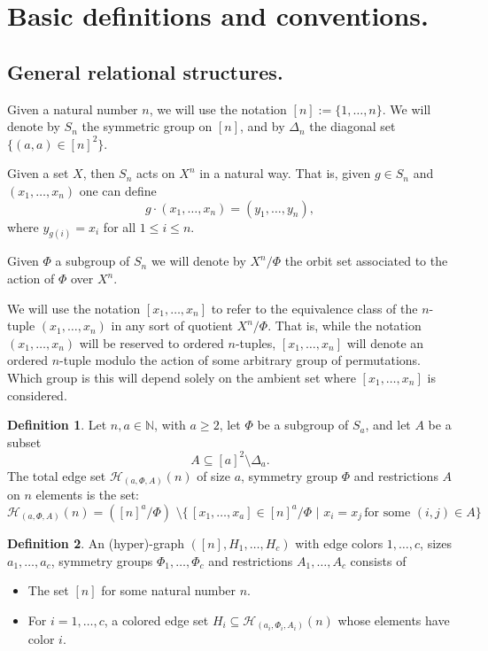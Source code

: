 \documentclass[11pt,notitlepage,a4paper]{article}
\theoremstyle{definition}
\newtheorem{definition}{Definition}[section]
\newcommand{\N}{\mathbb{N}}
\begin{document}
\section{Basic definitions and conventions.}



\subsection{General relational structures.}

Given a natural number $n$, we will use the notation
$[n]:= \{1,\dots, n\}$. We will denote by $S_n$
the symmetric group on $[n]$, and by $\Delta_n$ the 
diagonal set $\{(a,a)\in [n]^2 \}$. \par
Given a set $X$, then $S_n$ acts on $X^n$ in a natural way. That is, 
given $g\in S_n$ and $(x_1, \dots, x_n)$ one can define
\[ g \cdot (x_1,\dots,x_n) =(y_1,\dots,y_n), \]
where $y_{g(i)}=x_i$ for all $1\leq i\leq n$.\par
Given $\Phi$ a subgroup of $S_n$ we will denote by $X^n/\Phi$
the orbit set associated to the action of $\Phi$ over $X^n$.\par
We will use the notation $[x_1,\dots,x_n]$ to refer to the 
equivalence class of the $n$-tuple $(x_1,\dots, x_n)$ in 
any sort of quotient $X^n/\Phi$. That is, while the notation
$(x_1,\dots, x_n)$ will be reserved to ordered $n$-tuples, 
$[x_1,\dots,x_n]$ will denote an ordered $n$-tuple modulo the
action of some arbitrary group of permutations. Which group is this 
will depend solely on the ambient set where $[x_1,\dots,x_n]$ is
considered.
\par


\begin{definition}
	Let $n,a\in \N$, with $a\geq 2$, let $\Phi$ be a subgroup of $S_a$, and let
	$A$ be a subset 
	\[ A\subseteq [a]^2 \setminus \Delta_a.\]
	The total edge set $\mathcal{H}_{(a,\Phi, A)}(n)$ of size $a$, 
	symmetry group $\Phi$ and
	restrictions $A$ on $n$ elements is the set:
	\[  \mathcal{H}_{(a,\Phi, A)}(n)= ([n]^a/\Phi) \, \,
	\setminus \{\,  [x_1, \dots,x_a] \in [n]^a/\Phi  \, \, 
	| \, \, x_i=x_j \, \text{for some } (i,j)\in A \} \]
\end{definition}

\begin{definition}
	An (hyper)-graph $([n], H_1,\dots, H_c)$ with edge colors 
	$1,\dots, c$, sizes $a_1,\dots,a_c$, 
	symmetry groups $\Phi_1,\dots,\Phi_c$ and 
	restrictions $A_1,\dots,A_c$ consists of 
	\begin{itemize}
		\item The set $[n]$ for some natural number $n$.
		\item For $i=1,\dots,c$, a colored edge set $H_i\subseteq \mathcal{H}_{(a_i,\Phi_i,A_i)}(n)$ whose elements 
		have color $i$.
	\end{itemize}
\end{definition}
\end{document}
